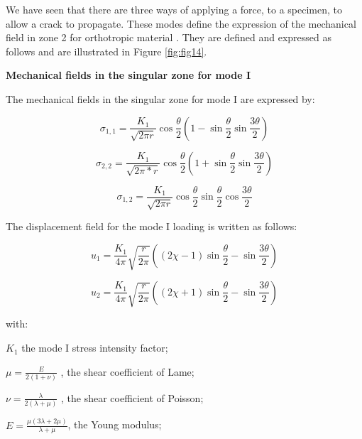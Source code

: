 We have seen that there are three ways of applying a force, to a specimen, to allow a crack to propagate. These modes define the expression of the mechanical field in zone 2 for orthotropic material \citep{Zeghloul2001phd}. They are defined and expressed as follows and are illustrated in Figure \ref{fig:fig14}.

\textbf{Mechanical fields in the singular zone for mode I}

The mechanical fields in the singular zone for mode I are expressed by:

\begin{equation}
	\sigma_{1,1} = \frac{K_{1}}{\sqrt{2 \pi r}} \cos{\frac{\theta}{2}}  \left( 1-\sin{\frac{\theta}{2}} \sin{\frac{3 \theta}{2}} \right)
	\label{eq:eq17}
\end{equation}

\begin{equation}
	\sigma_{2,2} = \frac{K_{1}}{\sqrt{2 \pi*r}} \cos{\frac{\theta}{2}}  \left( 1+\sin{\frac{\theta}{2}} \sin{\frac{3 \theta}{2}} \right)
	\label{eq:eq18}
\end{equation}

\begin{equation}
	\sigma_{1,2} = \frac{K_{1}}{\sqrt{2 \pi r}} \cos{\frac{\theta}{2}}  \sin{\frac{\theta}{2}} \cos{\frac{3 \theta}{2}}
	\label{eq:eq19}
\end{equation}

The displacement field for the mode I loading is written as follows:

\begin{equation}
	u_{1} = \frac{K_{1}}{4 \pi} \sqrt{\frac{r}{2 \pi}} \left((2 \chi-1) \sin{\frac{\theta}{2}}-\sin{\frac{3 \theta}{2}}\right)
	\label{eq:eq110}
\end{equation}

\begin{equation}
	u_{2} = \frac{K_{1}}{4 \pi} \sqrt{\frac{r}{2 \pi}} \left((2 \chi+1) \sin{\frac{\theta}{2}}-\sin{\frac{3 \theta}{2}}\right)
	\label{eq:eq111}
\end{equation}

\noindent with:

$K_1$  the mode I stress intensity factor;

$\mu=\displaystyle\frac{E}{2 (1+\nu)}$ , the shear coefficient of Lame;

$\nu=\displaystyle\frac{\lambda}{2 (\lambda+\mu)}$ , the shear coefficient of Poisson;

$E=\displaystyle\frac{\mu (3 \lambda+2 \mu)}{\lambda+\mu}$, the Young modulus;

